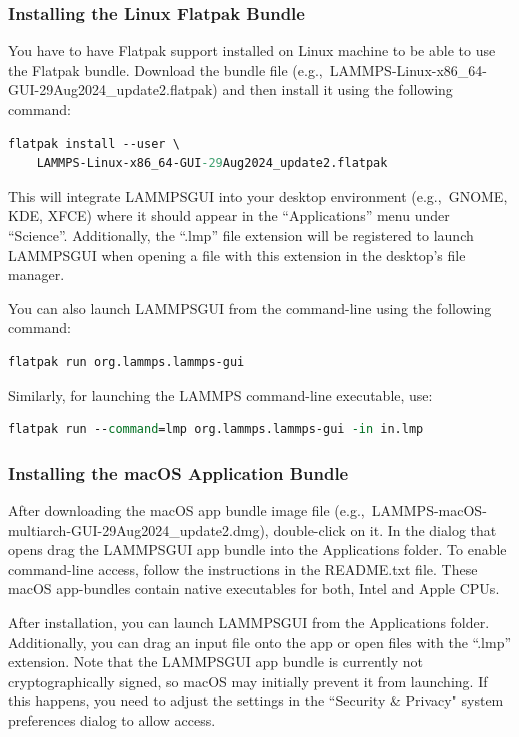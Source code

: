 \documentclass[9pt,tutorial]{livecoms}
\newcommand{\lammpsgui}{\textsf{LAMMPS\textendash GUI}}
\begin{document}
\begin{appendices}
\subsubsection{Installing the Linux Flatpak Bundle}

You have to have Flatpak support installed on Linux machine to be able
to use the Flatpak bundle.  Download the bundle file
(e.g.,~LAMMPS-Linux-x86\_64-GUI-29Aug2024\_update2.flatpak) and then
install it using the following command:
\begin{lstlisting}[language=tcl]
flatpak install --user \
    LAMMPS-Linux-x86_64-GUI-29Aug2024_update2.flatpak
\end{lstlisting}
This will integrate \lammpsgui{} into your desktop environment
(e.g.,~GNOME, KDE, XFCE) where it should appear in the ``Applications''
menu under ``Science''.  Additionally, the ``.lmp'' file extension will be
registered to launch \lammpsgui{} when opening a file with this
extension in the desktop's file manager.

You can also launch \lammpsgui{} from the command-line using the following command:
\begin{lstlisting}[language=tcl]
flatpak run org.lammps.lammps-gui
\end{lstlisting}
Similarly, for launching the LAMMPS command-line executable, use:
\begin{lstlisting}[language=tcl]
flatpak run --command=lmp org.lammps.lammps-gui -in in.lmp
\end{lstlisting}

\subsubsection{Installing the macOS Application Bundle}

After downloading the macOS app bundle image file
(e.g.,~LAMMPS-macOS-multiarch-GUI-29Aug2024\_update2.dmg), double-click
on it.  In the dialog that opens drag the \lammpsgui{} app bundle into
the Applications folder.  To enable command-line access, follow the
instructions in the README.txt file.  These macOS app-bundles contain
native executables for both, Intel and Apple CPUs.

After installation, you can launch \lammpsgui{} from the Applications
folder.  Additionally, you can drag an input file onto the app or open
files with the ``.lmp'' extension.  Note that the \lammpsgui{} app bundle is
currently not cryptographically signed, so macOS may initially prevent
it from launching.  If this happens, you need to adjust the settings in
the ``Security \& Privacy" system preferences dialog to allow access.


\end{appendices}
\end{document}
